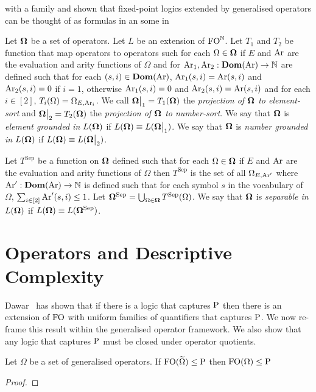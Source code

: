 \documentclass[../main/thesis.tex]{subfiles}
\begin{document}
with a family and shown that fixed-point logics extended by generalised
operators can be thought of as formulas in an some in


\begin{definition}
  Let $\mathbf{\mathbf{\Omega}}$ be a set of operators. Let $L$ be an extension of $\text{\upshape FO}^{\mathbb{N}}$.
  Let $T_1$ and $T_2$ be function that map operators to operators such for each
  $\Omega \in \mathbf{\mathbf{\Omega}}$ if $E$ and $\text{\upshape Ar}$ are the evaluation and arity functions of
  $\Omega$ and for $\text{\upshape Ar}_1, \text{\upshape Ar}_2 : \text{\textbf{Dom}}(\text{\upshape Ar}) \rightarrow \mathbb{N}$ are defined such that
  for each $(s, i) \in \text{\textbf{Dom}} (\text{\upshape Ar})$, $\text{\upshape Ar}_1 (s, i) = \text{\upshape Ar} (s, i)$ and $\text{\upshape Ar}_2 (s,
  i) = 0$ if $i = 1$, otherwise $\text{\upshape Ar}_1 (s, i) = 0$ and $\text{\upshape Ar}_2 (s, i) = \text{\upshape Ar}(s,
  i)$ and for each $i \in [2]$, $T_i (\Omega) = \Omega_{E, \text{\upshape Ar}_i}$. We call
  $\restr{\setop}{1} = T_1 (\setop)$ the \emph{projection of $\mathbf{\mathbf{\Omega}}$ to
    element-sort} and $\restr{\setop}{2} = T_2 (\setop)$ the \emph{projection of
    $\mathbf{\mathbf{\Omega}}$ to number-sort}. We say that $\mathbf{\mathbf{\Omega}}$ is \emph{element grounded in
    $L(\mathbf{\mathbf{\Omega}})$} if $L(\setop) \equiv L(\restr{\setop}{1})$. We say that
  $\mathbf{\mathbf{\Omega}}$ is \emph{number grounded in $L(\mathbf{\mathbf{\Omega}})$} if $L(\setop) \equiv
  L(\restr{\setop}{2})$.

  Let $T^{\text{Sep}}$ be a function on $\mathbf{\mathbf{\Omega}}$ defined such that for each
  $\Omega \in \mathbf{\mathbf{\Omega}}$ if $E$ and $\text{\upshape Ar}$ are the evaluation and arity functions of
  $\Omega$ then $T^{\text{Sep}}$ is the set of all $\Omega_{E, \text{\upshape Ar}'}$ where
  $\text{\upshape Ar}' : \text{\textbf{Dom}} (\text{\upshape Ar}) \rightarrow \mathbb{N}$ is defined such that for each symbol $s$ in the
  vocabulary of $\Omega$, $\sum_{i \in [2]} \text{\upshape Ar}' (s, i) \leq 1$. Let
  $\mathbf{\mathbf{\Omega}}^{\text{Sep}} = \bigcup_{\Omega \in \mathbf{\mathbf{\Omega}}} T^{\text{Sep}}(\Omega)$. We
  say that $\mathbf{\mathbf{\Omega}}$ is \emph{separable in $L(\mathbf{\mathbf{\Omega}})$} if $L(\mathbf{\mathbf{\Omega}}) \equiv
  L(\mathbf{\mathbf{\Omega}}^{\text{Sep}})$.


\end{definition}

\section{Operators and Descriptive Complexity}
Dawar~\cite{} has shown that if there is a logic that captures $\mathrm{P}$ then there
is an extension of $\text{\upshape FO}$ with uniform families of quantifiers that captures
$\mathrm{P}$. We now re-frame this result within the generalised operator framework. We
also show that any logic that captures $\mathrm{P}$ must be closed under operator
quotients.

\begin{lem}
  Let $\Omega$ be a set of generalised operators. If $\text{\upshape FO} (\widetilde{\Omega}) \leq
  \mathrm{P}$ then $\text{\upshape FO}(\Omega) \leq \mathrm{P}$
\end{lem}
\begin{proof}
\end{proof}
\end{document}
